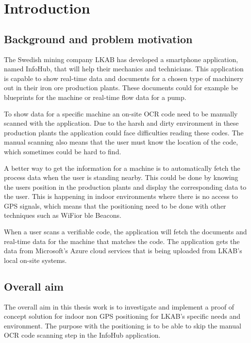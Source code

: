 \chapter{Introduction}\label{sec:intro} 

\section{Background and problem motivation}\label{sec:introBackground}
The Swedish mining company LKAB has developed a smartphone application, named InfoHub, that will help their mechanics and technicians.
This application is capable to show real-time data and documents for a chosen type of machinery out in their iron ore production plants.
These documents could for example be blueprints for the machine or real-time flow data for a pump.

\bigskip

To show data for a specific machine an on-site OCR code need to be manually scanned with the application.
Due to the harsh and dirty environment in these production plants the application could face difficulties reading these codes.
The manual scanning also means that the user must know the location of the code, which sometimes could be hard to find.

\bigskip

A better way to get the information for a machine is to automatically fetch the process data when the user is standing nearby. 
This could be done by knowing the users position in the production plants and display the corresponding data to the user.
This is happening in indoor environments where there is no access to GPS signals, which means that the positioning need to be done with other techniques such as WiFior \acrlong{ble} Beacons.

\bigskip

When a user scans a verifiable code, the application will fetch the documents and real-time data for the machine that matches the code.
The application gets the data from Microsoft’s Azure cloud services that is being uploaded from LKAB’s local on-site systems.

\section{Overall aim}\label{sec:introOverallAim}
The overall aim in this thesis work is to investigate and implement a proof of concept solution for indoor non GPS positioning for LKAB's specific needs and environment.
The purpose with the positioning is to be able to skip the manual OCR code scanning step in the InfoHub application.


